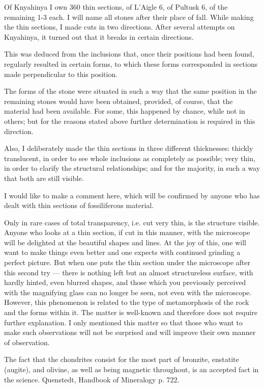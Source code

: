 \documentclass[a4paper, 11pt, oneside]{article}
\begin{document}
Of Knyahinya I own 360 thin sections, of L'Aigle 6, of Pultusk 6, of the remaining 1-3 each. I will name all stones after their place of fall. While making the thin sections, I made cuts in two directions. After several attempts on Knyahinya, it turned out that it breaks in certain directions.

This was deduced from the inclusions that, once their positions had been found, regularly resulted in certain forms, to which these forms corresponded in sections made perpendicular to this position.

The forms of the stone were situated in such a way that the same position in the remaining stones would have been obtained, provided, of course, that the material had been available. For some, this happened by chance, while not in others; but for the reasons stated above further determination is required in this direction.

Also, I deliberately made the thin sections in three different thicknesses: thickly translucent, in order to see whole inclusions as completely as possible; very thin, in order to clarify the structural relationships; and for the majority, in such a way that both are still visible.

I would like to make a comment here, which will be confirmed by anyone who has dealt with thin sections of fossiliferous material.

Only in rare cases of total transparency, i.e. cut very thin, is the structure visible. Anyone who looks at a thin section, if cut in this manner, with the microscope will be delighted at the beautiful shapes and lines. At the joy of this, one will want to make things even better and one expects with continued grinding a perfect picture. But when one puts the thin section under the microscope after this second try — there is nothing left but an almost structureless surface, with hardly hinted, even blurred shapes, and those which you previously perceived with the magnifying glass can no longer be seen, not even with the microscope. However, this phenomenon is related to the type of metamorphosis of the rock and the forms within it. The matter is well-known and therefore does not require further explanation. I only mentioned this matter so that those who want to make such observations will not be surprised and will improve their own manner of observation.

The fact that the chondrites consist for the most part of bronzite, enstatite (augite), and olivine, as well as being magnetic throughout, is an accepted fact in the science. Quenstedt, Handbook of Mineralogy p. 722.
\end{document}
